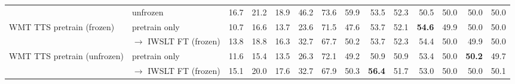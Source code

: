 \begin{table}[t]
\begin{tabular}{p{3cm}l|rrr|rrr|rrr|rrr}
 & unfrozen & \cellcolor[RGB]{187,226,225}16.7 & \cellcolor[RGB]{196,229,229}21.2 & \cellcolor[RGB]{193,228,228}18.9 & \cellcolor[RGB]{196,229,229}46.2 & \cellcolor[RGB]{207,234,234}73.6 & \cellcolor[RGB]{189,226,226}59.9 & \cellcolor[RGB]{252,215,187}53.5 & \cellcolor[RGB]{252,213,184}52.3 & \cellcolor[RGB]{254,247,241}50.5 & \cellcolor[RGB]{255,255,255}50.0 & \cellcolor[RGB]{255,255,255}50.0 & \cellcolor[RGB]{255,255,255}50.0 \\
\cmidrule(l){1-14}
\multirow{2}{*}{\parbox[t]{3cm}{\raggedright WMT TTS pretrain (frozen)}} & pretrain only & \cellcolor[RGB]{227,243,242}10.7 & \cellcolor[RGB]{229,244,243}16.6 & \cellcolor[RGB]{237,247,247}13.7 & \cellcolor[RGB]{255,255,255}23.6 & \cellcolor[RGB]{214,237,237}71.5 & \cellcolor[RGB]{255,255,255}47.6 & \cellcolor[RGB]{252,213,183}53.7 & \cellcolor[RGB]{252,217,190}52.1 & \cellcolor[RGB]{250,183,132}\textbf{54.6} & \cellcolor[RGB]{255,255,255}49.9 & \cellcolor[RGB]{255,255,255}50.0 & \cellcolor[RGB]{255,255,255}50.0 \\
 & \quad $\to$ IWSLT FT (frozen) & \cellcolor[RGB]{207,234,234}13.8 & \cellcolor[RGB]{213,237,236}18.8 & \cellcolor[RGB]{215,238,237}16.3 & \cellcolor[RGB]{231,244,244}32.7 & \cellcolor[RGB]{227,243,243}67.7 & \cellcolor[RGB]{241,249,248}50.2 & \cellcolor[RGB]{252,213,183}53.7 & \cellcolor[RGB]{252,213,184}52.3 & \cellcolor[RGB]{250,186,137}54.4 & \cellcolor[RGB]{255,255,255}50.0 & \cellcolor[RGB]{255,255,255}49.9 & \cellcolor[RGB]{255,255,255}50.0 \\
\cmidrule(l){2-14}
\multirow{3}{*}{\parbox[t]{3cm}{\raggedright WMT TTS pretrain (unfrozen)}} & pretrain only & \cellcolor[RGB]{221,240,240}11.6 & \cellcolor[RGB]{238,247,247}15.4 & \cellcolor[RGB]{239,248,248}13.5 & \cellcolor[RGB]{248,252,251}26.3 & \cellcolor[RGB]{212,236,236}72.1 & \cellcolor[RGB]{246,251,251}49.2 & \cellcolor[RGB]{254,244,237}50.9 & \cellcolor[RGB]{253,238,227}50.9 & \cellcolor[RGB]{251,202,164}53.4 & \cellcolor[RGB]{255,255,255}50.0 & \cellcolor[RGB]{232,168,205}\textbf{50.2} & \cellcolor[RGB]{255,255,255}49.7 \\
 & \quad $\to$ IWSLT FT (frozen) & \cellcolor[RGB]{198,230,230}15.1 & \cellcolor[RGB]{204,233,232}20.0 & \cellcolor[RGB]{205,233,233}17.6 & \cellcolor[RGB]{231,244,244}32.7 & \cellcolor[RGB]{227,243,242}67.9 & \cellcolor[RGB]{240,248,248}50.3 & \cellcolor[RGB]{250,183,132}\textbf{56.4} & \cellcolor[RGB]{252,224,202}51.7 & \cellcolor[RGB]{251,208,174}53.0 & \cellcolor[RGB]{255,255,255}50.0 & \cellcolor[RGB]{255,255,255}50.0 & \cellcolor[RGB]{247,226,238}50.1 \\

\end{tabular}
\end{table}
